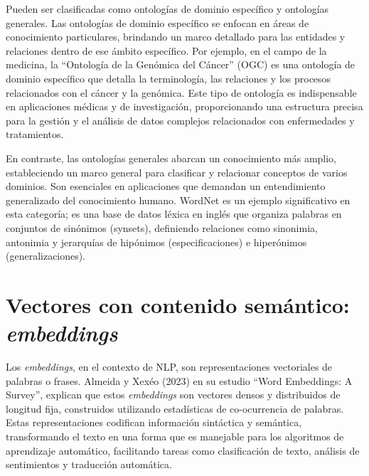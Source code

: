 Pueden ser clasificadas como ontologías de dominio específico y ontologías generales. Las ontologías de dominio específico se enfocan en áreas de conocimiento particulares, brindando un marco detallado para las entidades y relaciones dentro de ese ámbito específico. Por ejemplo, en el campo de la medicina, la ``Ontología de la Genómica del Cáncer'' (OGC) es una ontología de dominio específico que detalla la terminología, las relaciones y los procesos relacionados con el cáncer y la genómica. Este tipo de ontología es indispensable en aplicaciones médicas y de investigación, proporcionando una estructura precisa para la gestión y el análisis de datos complejos relacionados con enfermedades y tratamientos.

En contraste, las ontologías generales abarcan un conocimiento más amplio, estableciendo un marco general para clasificar y relacionar conceptos de varios dominios. Son esenciales en aplicaciones que demandan un entendimiento generalizado del conocimiento humano. WordNet es un ejemplo significativo en esta categoría; es una base de datos léxica en inglés que organiza palabras en conjuntos de sinónimos (synsets), definiendo relaciones como sinonimia, antonimia y jerarquías de hipónimos (especificaciones) e hiperónimos (generalizaciones).


\section{Vectores con contenido sem\'antico: \textit{embeddings}}

Los \textit{embeddings}, en el contexto de NLP, son representaciones vectoriales de palabras o frases. Almeida y Xexéo (2023) en su estudio ``Word Embeddings: A Survey'', explican que estos \textit{embeddings} son vectores densos y distribuidos de longitud fija, construidos utilizando estadísticas de co-ocurrencia de palabras. Estas representaciones codifican información sintáctica y semántica, transformando el texto en una forma que es manejable para los algoritmos de aprendizaje automático, facilitando tareas como clasificación de texto, análisis de sentimientos y traducción automática.

